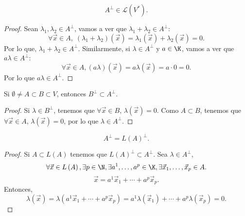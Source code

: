 \begin{fprop}[]
\normalfont 
\[A^{\perp} \in \mathcal{L}\left(V^{*}\right) .\]
\end{fprop}

\begin{proof}
Sean $\displaystyle \lambda_{1}, \lambda_{2} \in A^{\perp} $, vamos a ver que $\displaystyle \lambda_{1} + \lambda _{2} \in A^{\perp} $:
\[\forall\vec{x} \in A, \; \left(\lambda_{1}+\lambda_{2}\right)\left(\vec{x}\right) = \lambda_{1}\left(\vec{x}\right) + \lambda_{2}\left(\vec{x}\right) = 0 .\]
Por lo que, $\displaystyle \lambda_{1} + \lambda_{2} \in A^{\perp} $. Similarmente, si $\displaystyle \lambda \in A^{\perp} $ y $\displaystyle a \in \K $, vamos a ver que $\displaystyle a\lambda \in A^{\perp} $:
\[\forall\vec{x} \in A, \left(a\lambda\right)\left(\vec{x}\right) = a\lambda\left(\vec{x}\right) = a \cdot 0= 0.\]
Por lo que $\displaystyle a\lambda \in A^{\perp} $.
\end{proof}

\begin{fprop}[]
\normalfont Si $\displaystyle \emptyset \neq A \subset B \subset V $, entonces $\displaystyle B^{\perp} \subset A^{\perp} $.
\end{fprop}

\begin{proof}
Si $\displaystyle \lambda \in B^{\perp} $, tenemos que $\displaystyle \forall \vec{x} \in B $, $\displaystyle \lambda\left(\vec{x}\right) = 0 $. Como $\displaystyle A \subset B $, tenemos que $\displaystyle \forall \vec{x} \in A $, $\displaystyle \lambda\left(\vec{x}\right) = 0 $, por lo que $\displaystyle \lambda \in A^{\perp} $.
\end{proof}

\begin{fprop}[]
\normalfont 
\[A^{\perp} = L\left(A\right)^{\perp} .\]
\end{fprop}

\begin{proof}
Si $\displaystyle A \subset L\left(A\right) $ tenemos que $\displaystyle L\left(A\right)^{\perp} \subset A^{\perp} $. Sea $\displaystyle \lambda \in A^{\perp} $, 
\[\forall \vec{x}\in L\left(A\right), \exists p \in \N, \exists a^{1}, \ldots, a^{p} \in \K, \exists \vec{x}_{1}, \ldots, \vec{x}_{p} \in A .\]
\[\vec{x} = a^{1}\vec{x}_{1}+\cdots + a^{p}\vec{x}_{p} .\]
Entonces, 
\[\lambda\left(\vec{x}\right) = \lambda\left(a^{1}\vec{x}_{1}+\cdots + a^{p}\vec{x}_{p}\right) = a^{1}\lambda\left(\vec{x}_{1}\right)+\cdots + a^{p}\lambda\left(\vec{x}_{p}\right) = 0 .\]
\end{proof}

